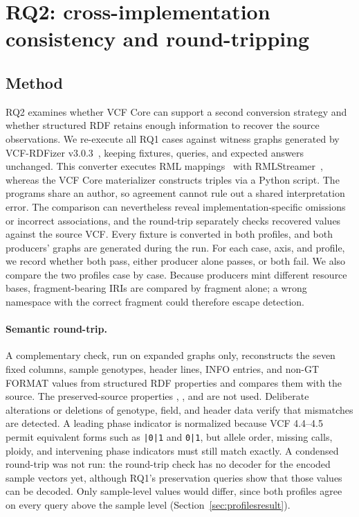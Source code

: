 \section{RQ2: cross-implementation consistency and round-tripping}
\subsection{Method}
\label{sec:m-rq2}

RQ2 examines whether VCF Core can support a second conversion strategy and whether structured RDF retains enough information to recover the source observations.
We re-execute all RQ1 cases against witness graphs generated by VCF-RDFizer v3.0.3~\cite{vcfrConverter2026}, keeping fixtures, queries, and expected answers unchanged.
This converter executes RML mappings~\cite{dimou2014rml} with RMLStreamer~\cite{haesendonck2019rmlstreamer}, whereas the VCF Core materializer constructs triples via a Python script.
The programs share an author, so agreement cannot rule out a shared interpretation error.
The comparison can nevertheless reveal implementation-specific omissions or incorrect associations, and the round-trip separately checks recovered values against the source VCF.
Every fixture is converted in both profiles, and both producers' graphs are generated during the run.
For each case, axis, and profile, we record whether both pass, either producer alone passes, or both fail.
We also compare the two profiles case by case.
Because producers mint different resource bases, fragment-bearing IRIs are compared by fragment alone; a wrong namespace with the correct fragment could therefore escape detection.

\paragraph{Semantic round-trip.}
A complementary check, run on expanded graphs only, reconstructs the seven fixed columns, sample genotypes, header lines, INFO entries, and non-GT FORMAT values from structured RDF properties and compares them with the source.
The preserved-source properties , , and  are not used.
Deliberate alterations or deletions of genotype, field, and header data verify that mismatches are detected.
A leading phase indicator is normalized because VCF 4.4--4.5 permit equivalent forms such as \texttt{|0|1} and \texttt{0|1}, but allele order, missing calls, ploidy, and intervening phase indicators must still match exactly.
A condensed round-trip was not run: the round-trip check has no decoder for the encoded sample vectors yet, although RQ1's preservation queries show that those values can be decoded.
Only sample-level values would differ, since both profiles agree on every query above the sample level (Section~\ref{sec:profilesresult}).

